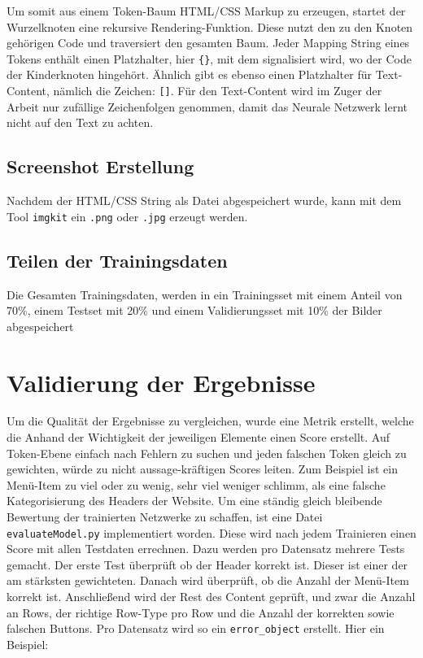 \documentclass[pdftex,a4paper,halfparskip, article]{scrartcl}
\begin{document}
Um somit aus einem Token-Baum HTML/CSS Markup zu erzeugen, startet der Wurzelknoten eine rekursive Rendering-Funktion. Diese nutzt den zu den Knoten gehörigen Code und traversiert den gesamten Baum. Jeder Mapping String eines Tokens enthält einen Platzhalter, hier \texttt{\{\}}, mit dem signalisiert wird, wo der Code der Kinderknoten hingehört. Ähnlich gibt es ebenso einen Platzhalter für Text-Content, nämlich die Zeichen: \texttt{[]}. 
Für den Text-Content wird im Zuger der Arbeit nur zufällige Zeichenfolgen genommen, damit das Neurale Netzwerk lernt nicht auf den Text zu achten. 


\subsection{Screenshot Erstellung}

Nachdem der HTML/CSS String als Datei abgespeichert wurde, kann mit dem Tool \texttt{imgkit} ein \texttt{.png} oder \texttt{.jpg} erzeugt werden.

\subsection{Teilen der Trainingsdaten}

Die Gesamten Trainingsdaten, werden in ein Trainingsset mit einem Anteil von 70\%, einem Testset mit 20\% und einem Validierungsset mit 10\% der Bilder abgespeichert

\section{Validierung der Ergebnisse}

Um die Qualität der Ergebnisse zu vergleichen, wurde eine Metrik erstellt, welche die Anhand der Wichtigkeit der jeweiligen Elemente einen Score erstellt. Auf Token-Ebene einfach nach Fehlern zu suchen und jeden falschen Token gleich zu gewichten, würde zu nicht aussage-kräftigen Scores leiten. Zum Beispiel ist ein Menü-Item zu viel oder zu wenig, sehr viel weniger schlimm, als eine falsche Kategorisierung des Headers der Website. Um eine ständig gleich bleibende Bewertung der trainierten Netzwerke zu schaffen, ist eine Datei \texttt{evaluateModel.py} implementiert worden. Diese wird nach jedem Trainieren einen Score mit allen Testdaten errechnen. Dazu werden pro Datensatz mehrere Tests gemacht. Der erste Test überprüft ob der Header korrekt ist. Dieser ist einer der am stärksten gewichteten. Danach wird überprüft, ob die Anzahl der Menü-Item korrekt ist. Anschließend wird der Rest des Content geprüft, und zwar die Anzahl an Rows, der richtige Row-Type pro Row und die Anzahl der korrekten sowie falschen Buttons. Pro Datensatz wird so ein \texttt{error\_object} erstellt. 
Hier ein Beispiel:
\end{document}
